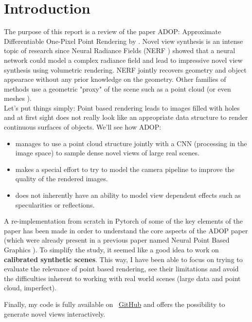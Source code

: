 \section{Introduction}
\label{sec:intro}
The purpose of this report is a review of the paper ADOP: Approximate Differentiable One-Pixel Point Rendering by \citet{Aruckert2022adop}.
Novel view synthesis is an intense topic of research since Neural Radiance Fields (NERF \cite{mildenhall2020nerf}) showed that a neural network could model a complex radiance field and lead to impressive novel view synthesis using volumetric rendering. NERF jointly recovers geometry and object appearace without any prior knowledge on the geometry. 
Other families of methods use a geometric "proxy" of the scene such as a point cloud \cite{Aliev2020} (or even meshes \cite{worchel2022nds}). \\
Let's put things simply: Point based rendering leads to images filled with holes and at first sight does not really look like an appropriate data structure to render continuous surfaces of objects.
We'll see how ADOP:
\begin{itemize}
    \item manages to use a point cloud structure jointly with a CNN (processing in the image space) to sample dense novel views of large real scenes.
    \item makes a special effort to try to model the camera pipeline to improve the quality of the rendered images.
    \item does not inherently have an ability to model view dependent effects such as specularities or reflections.
\end{itemize}

A re-implementation from scratch in Pytorch of some of the key elements of the paper has been made in order to understand the core aspects of the ADOP paper (which were already present in a previous paper named Neural Point Based Graphics \cite{Aliev2020}). To simplify the study, it seemed like a good idea to work on \textbf{calibrated synthetic scenes}. This way, I have been able to focus on trying to evaluate the relevance of point based rendering, see their limitations and avoid the difficulties inherent to working with real world scenes (large data and point cloud, imperfect).

\noindent Finally, my code is fully available on ~\href{https://github.com/balthazarneveu/per-pixel-point-rendering}{GitHub} and offers the possibility to generate novel views interactively.
